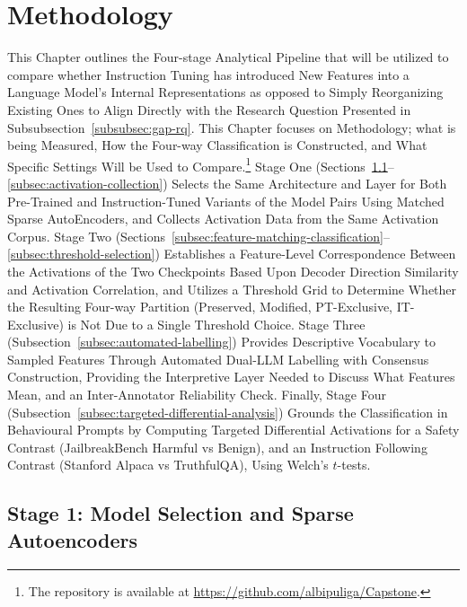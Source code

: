 \pagestyle{fancy}

\section{Methodology}
\label{sec:methodology}

This Chapter outlines the Four-stage Analytical Pipeline that will be utilized to compare whether Instruction Tuning has introduced New Features into a Language Model's Internal Representations as opposed to Simply Reorganizing Existing Ones to Align Directly with the Research Question Presented in Subsubsection~\ref{subsubsec:gap-rq}. This Chapter focuses on Methodology; what is being Measured, How the Four-way Classification is Constructed, and What Specific Settings Will be Used to Compare.\footnote{The repository is available at \url{https://github.com/albipuliga/Capstone}.} Stage One (Sections~\ref{subsec:models-saes}--\ref{subsec:activation-collection}) Selects the Same Architecture and Layer for Both Pre-Trained and Instruction-Tuned Variants of the Model Pairs Using Matched Sparse AutoEncoders, and Collects Activation Data from the Same Activation Corpus. Stage Two (Sections~\ref{subsec:feature-matching-classification}--\ref{subsec:threshold-selection}) Establishes a Feature-Level Correspondence Between the Activations of the Two Checkpoints Based Upon Decoder Direction Similarity and Activation Correlation, and Utilizes a Threshold Grid to Determine Whether the Resulting Four-way Partition (Preserved, Modified, PT-Exclusive, IT-Exclusive) is Not Due to a Single Threshold Choice. Stage Three (Subsection~\ref{subsec:automated-labelling}) Provides Descriptive Vocabulary to Sampled Features Through Automated Dual-LLM Labelling with Consensus Construction, Providing the Interpretive Layer Needed to Discuss What Features Mean, and an Inter-Annotator Reliability Check. Finally, Stage Four (Subsection~\ref{subsec:targeted-differential-analysis}) Grounds the Classification in Behavioural Prompts by Computing Targeted Differential Activations for a Safety Contrast (JailbreakBench Harmful vs Benign), and an Instruction Following Contrast (Stanford Alpaca vs TruthfulQA), Using Welch's $t$-tests.

\subsection{Stage 1: Model Selection and Sparse Autoencoders}
\label{subsec:models-saes}

